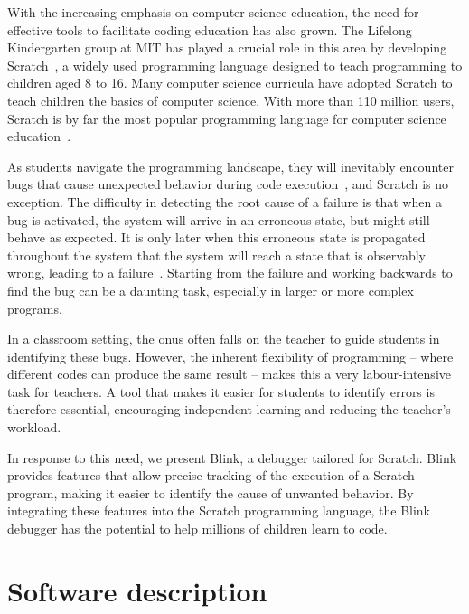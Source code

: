 \documentclass[../main]{subfiles}
\begin{document}
With the increasing emphasis on computer science education, the need for effective tools to facilitate coding education has also grown.
The Lifelong Kindergarten group at MIT has played a crucial role in this area by developing Scratch~\autocite{resnickScratchProgrammingAll2009}, a widely used programming language designed to teach programming to children aged 8 to 16.
Many computer science curricula have adopted Scratch to teach children the basics of computer science.
With more than 110 million users, Scratch is by far the most popular programming language for computer science education~\autocite{TIOBEIndexSeptember2023a}.

As students navigate the programming landscape, they will inevitably encounter bugs that cause unexpected behavior during code execution~\autocite{zellerWhyProgramsFail2009a}, and Scratch is no exception.
The difficulty in detecting the root cause of a failure is that when a bug is activated, the system will arrive in an erroneous state, but might still behave as expected.
It is only later when this erroneous state is propagated throughout the system that the system will reach a state that is observably wrong, leading to a failure~\autocite{ammannIntroductionSoftwareTesting2016}.
Starting from the failure and working backwards to find the bug can be a daunting task, especially in larger or more complex programs.

In a classroom setting, the onus often falls on the teacher to guide students in identifying these bugs.
However, the inherent flexibility of programming -- where different codes can produce the same result -- makes this a very labour-intensive task for teachers.
A tool that makes it easier for students to identify errors is therefore essential, encouraging independent learning and reducing the teacher's workload.

In response to this need, we present Blink, a debugger tailored for Scratch.
Blink provides features that allow precise tracking of the execution of a Scratch program, making it easier to identify the cause of unwanted behavior.
By integrating these features into the Scratch programming language, the Blink debugger has the potential to help millions of children learn to code.

\section{Software description}\label{sec:blink-software-description}
\end{document}
